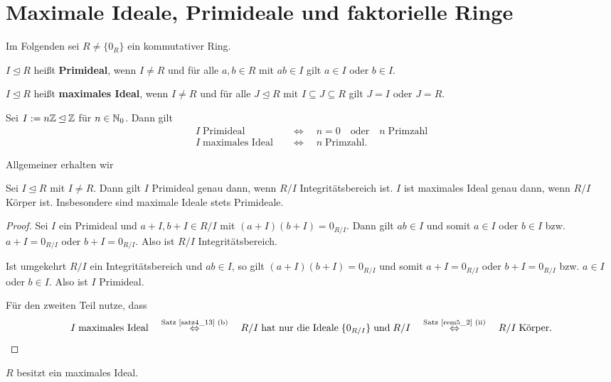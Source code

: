 \section{Maximale Ideale, Primideale und faktorielle Ringe}
Im Folgenden sei $R \neq \{0_R\}$ ein kommutativer Ring.
\begin{definition}
	$I \unlhd R$ heißt \textbf{Primideal}, wenn $I \neq R$ und für alle $a,b \in R$ mit $ab \in I$ gilt $a \in I$ oder $b \in I$.
	
	$I \unlhd R$ heißt \textbf{maximales Ideal}, wenn $I \neq R$ und für alle $J \unlhd R$ mit $I \subseteq J \subseteq R$ gilt $J = I$ oder $J = R$.
\end{definition}
\begin{beispiel}\label{beispiel6_2}
	Sei $I := n\mathbb{Z} \unlhd \mathbb{Z}$ für $n \in \mathbb{N}_0$. Dann gilt
	\begin{align*}
		I \;\text{Primideal} \quad&\Leftrightarrow\quad n = 0 \quad\text{oder}\quad n \;\text{Primzahl}\\
		I \;\text{maximales Ideal} \quad&\Leftrightarrow\quad n \;\text{Primzahl}.
	\end{align*}
\end{beispiel}
Allgemeiner erhalten wir
\begin{prop}\label{prop6_3}
	Sei $I \unlhd R$ mit $I \neq R$. Dann gilt $I$ Primideal genau dann, wenn $R/I$ Integritätsbereich ist. $I$ ist maximales Ideal genau dann, wenn $R/I$ Körper ist. Insbesondere sind maximale Ideale stets Primideale.
\end{prop}
\begin{proof}
	Sei $I$ ein Primideal und $a + I, b + I \in R/I$ mit $(a+I)(b+I) = 0_{R/I}$. Dann gilt $ab \in I$ und somit $a \in I$ oder $b \in I$ bzw. $a + I = 0_{R/I}$ oder $b + I = 0_{R/I}$. Also ist $R/I$ Integritätsbereich.
	
	Ist umgekehrt $R/I$ ein Integritätsbereich und $ab \in I$, so gilt $(a+I)(b+I) = 0_{R/I}$ und somit $a + I = 0_{R/I}$ oder $b+I = 0_{R/I}$ bzw. $a \in I$ oder $b \in I$. Also ist $I$ Primideal.
	
	Für den zweiten Teil nutze, dass
	\[I\;\text{maximales Ideal} \quad\overset{\text{Satz \ref{satz4_13} (b)}}{\Leftrightarrow}\quad R/I \; \text{hat nur die Ideale}\;\{0_{R/I}\}\;\text{und}\;R/I \quad\overset{\text{Satz \ref{rem5_2} (ii)}}{\Leftrightarrow}\quad R/I \;\text{Körper}.\]
\end{proof}
\begin{satz}\label{satz6_4}
	$R$ besitzt ein maximales Ideal.
\end{satz}
